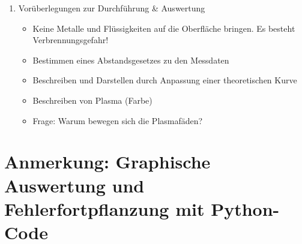 \documentclass{article}
\begin{document}
\begin{enumerate}[label = (\Roman*)]
    \item Vorüberlegungen zur Durchführung \& Auswertung
        \begin{itemize}
            \item Keine Metalle und Flüssigkeiten auf die Oberfläche bringen. Es besteht Verbrennungsgefahr!
            \item Bestimmen eines Abstandsgesetzes zu den Messdaten
            \item Beschreiben und Darstellen durch Anpassung einer theoretischen Kurve
            \item Beschreiben von Plasma (Farbe)
            \item Frage: Warum bewegen sich die Plasmafäden?
        \end{itemize}
        
\end{enumerate}

\newpage

\section{Anmerkung: Graphische Auswertung und Fehlerfortpflanzung mit Python-Code}
\end{document}
